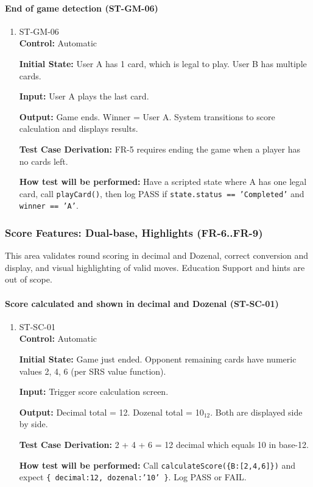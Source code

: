 \documentclass[12pt, titlepage]{article}
\begin{document}
\paragraph{End of game detection (ST-GM-06)}
\begin{enumerate}
\item{ST-GM-06\\}
\textbf{Control:} Automatic

\textbf{Initial State:} User A has 1 card, which is legal to play. User B has multiple cards.

\textbf{Input:} User A plays the last card.

\textbf{Output:} Game ends. Winner = User A. System transitions to score calculation and displays results.

\textbf{Test Case Derivation:} FR-5 requires ending the game when a player has no cards left.

\textbf{How test will be performed:} Have a scripted state where A has one legal card, call \texttt{playCard()}, then log PASS if \texttt{state.status == 'Completed'} and \texttt{winner == 'A'}.
\end{enumerate}

\subsubsection{Score Features: Dual-base, Highlights (FR-6..FR-9)}

This area validates round scoring in decimal and Dozenal, correct conversion and display, and visual highlighting of valid moves. Education Support and hints are out of scope.

\paragraph{Score calculated and shown in decimal and Dozenal (ST-SC-01)}
\begin{enumerate}
\item{ST-SC-01\\}
\textbf{Control:} Automatic

\textbf{Initial State:} Game just ended. Opponent remaining cards have numeric values 2, 4, 6 (per SRS value function).

\textbf{Input:} Trigger score calculation screen.

\textbf{Output:} Decimal total = 12. Dozenal total = 10$_{12}$. Both are displayed side by side.

\textbf{Test Case Derivation:} 2 + 4 + 6 = 12 decimal which equals 10 in base-12.

\textbf{How test will be performed:} Call \texttt{calculateScore(\{B:[2,4,6]\})} and expect \texttt{\{ decimal:12, dozenal:'10' \}}. Log PASS or FAIL.
\end{enumerate}
\end{document}
